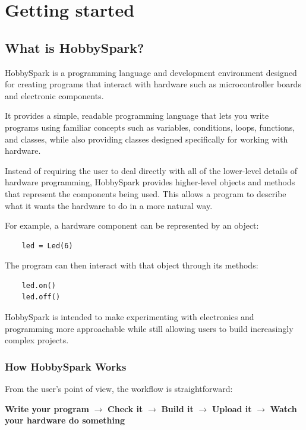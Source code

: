 \chapter{Getting started}
\section{What is HobbySpark?}

HobbySpark is a programming language and development environment
designed for creating programs that interact with hardware such as
microcontroller boards and electronic components.

It provides a simple, readable programming language that lets you
write programs using familiar concepts such as variables, conditions,
loops, functions, and classes, while also providing classes designed
specifically for working with hardware.

Instead of requiring the user to deal directly with all of the
lower-level details of hardware programming, HobbySpark provides
higher-level objects and methods that represent the components being
used. This allows a program to describe what it wants the hardware to
do in a more natural way.

For example, a hardware component can be represented by an object:

\begin{lstlisting}
	led = Led(6)
\end{lstlisting}

The program can then interact with that object through its methods:

\begin{lstlisting}
	led.on()
	led.off()
\end{lstlisting}

HobbySpark is intended to make experimenting with electronics and
programming more approachable while still allowing users to build
increasingly complex projects.

\subsection{How HobbySpark Works}

From the user's point of view, the workflow is straightforward:

\begin{center}
	\textbf{Write your program}
	$\rightarrow$
	\textbf{Check it}
	$\rightarrow$
	\textbf{Build it}
	$\rightarrow$
	\textbf{Upload it}
	$\rightarrow$
	\textbf{Watch your hardware do something}
\end{center}

